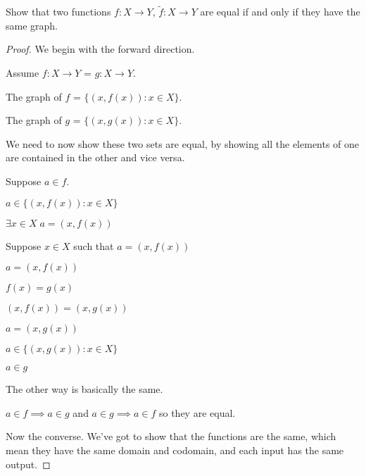 \documentclass[../../main.tex]{subfiles}
\begin{document}
\begin{enumerate}
    \item \begin{q}
        Show that two functions $f : X \to Y$, $\tilde{f} : X \to Y$ are equal if and only if they have the same graph.
    \end{q}
    \begin{proof}
        We begin with the forward direction.
        \begin{linebyline}
            \item Assume $f : X \to Y$ = $g : X \to Y$.
            \item The graph of $f$ = $\{(x, f(x)) : x \in X\}$.
            \item The graph of $g$ = $\{(x, g(x)) : x \in X\}$.
        \end{linebyline}
        We need to now show these two sets are equal, by showing all the elements of one are contained in the other and vice versa.
        \begin{linebyline}[resume]
            \item Suppose $a \in f$.
            \begin{linebyline}
                \item $a \in \{(x, f(x)) : x \in X\}$
                \item $\exists x \in X \; a = (x, f(x))$ 
                \item Suppose $x \in X$ such that $a = (x, f(x))$
                \begin{linebyline}
                    \item $a = (x, f(x))$
                    \item $f(x)=g(x)$
                    \item $(x, f(x)) = (x, g(x))$
                    \item $a = (x, g(x))$
                \end{linebyline}
                \item $a \in \{(x, g(x)) : x \in X\}$
                \item $a \in g$
            \end{linebyline}
            \item The other way is basically the same.
            \item $a \in f \implies a \in g$ and $a \in g \implies a \in f$ so they are equal.
        \end{linebyline}
        Now the converse.
        We've got to show that the functions are the same, which mean they have the same domain and codomain, and each input has the same output.

\end{proof}
\end{enumerate}
\end{document}
